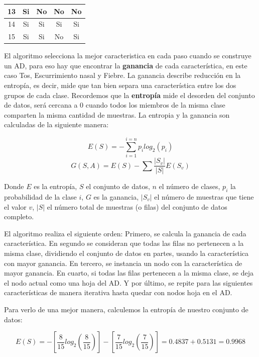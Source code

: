 \documentclass[twoside,spanish,ESP,MSc]{plantillaLabUPV}
\theoremstyle{definition}
\begin{document}
\begin{table}[!tbh]
\begin{tabular}{|c|c|c|c|c|}
		13          & Si           & No                                                                     & No              & No             \\ \hline
		14          & Si           & Si                                                                     & Si              & Si             \\ \hline
		15          & Si           & Si                                                                     & No              & Si             \\ \hline
	\end{tabular}
\end{table}

El algoritmo selecciona la mejor caracteristica en cada paso cuando se construye un AD, para eso hay que encontrar la \textbf{ganancia} de cada característica, en este caso Tos, Escurrimiento nasal y Fiebre. La ganancia describe reducción en la entropía, es decir, mide que tan bien separa una característica entre los dos grupos de cada clase. Recordemos que la \textbf{entropía} mide el desorden del conjunto de datos, será cercana a 0 cuando todos los miembros de la misma clase comparten la misma cantidad de muestras. La entropia y la ganancia son calculadas de la siguiente manera:

 $$E(S) = -\sum_{i=1}^{i=n} p_i log_{2}(p_i)$$
 $$G(S,A)= E(S) - \sum\frac{|S_v|}{|S|} E(S_v)$$
 
 Donde $E$ es la entropía, $S$ el conjunto de datos, $n$ el número de clases, $p_i$ la probabilidad de la clase $i$, $G$ es la ganancia, $|S_v|$ el número de muestras que tiene el valor $v$, $|S|$ el número total de muestras (o filas) del conjunto de datos completo.
 
 El algoritmo realiza el siguiente orden: Primero, se calcula la ganancia de cada característica. En segundo se consideran que todas las filas no pertenecen a la misma clase, dividiendo el conjunto de datos en partes, usando la característica con mayor ganancia. En tercero, se instancia un nodo con la característica de mayor ganancia. En cuarto, si todas las filas pertenecen a la misma clase, se deja el nodo actual como una hoja del AD. Y por último, se repite para las siguientes características de manera iterativa hasta quedar con nodos hoja en el AD.
 
 Para verlo de una mejor manera, calculemos la entropía de nuestro conjunto de datos:
 
  $$E(S) = - \left[\frac{8}{15} log_{2}\left(\frac{8}{15}\right)\right] - \left[\frac{7}{15} log_{2}\left(\frac{7}{15}\right)\right] = 0.4837 + 0.5131 = 0.9968$$
 
\end{document}
